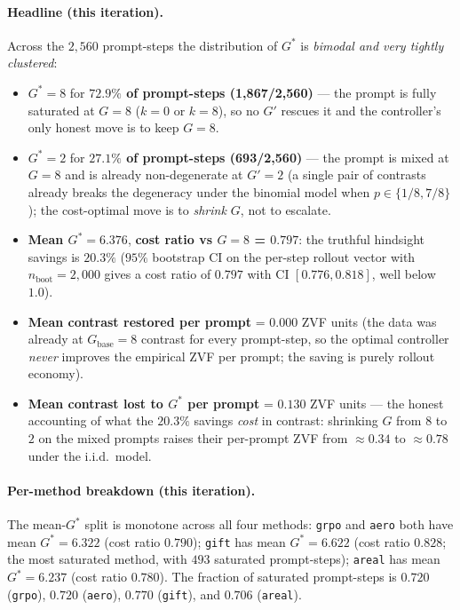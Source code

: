 \paragraph{Headline (this iteration).}
Across the $2{,}560$ prompt-steps the distribution of $G^*$ is
\emph{bimodal and very tightly clustered}:
\begin{itemize}
\item $G^* = 8$ for \textbf{$72.9\%$ of prompt-steps (1{,}867/2{,}560)} ---
the prompt is fully saturated at $G{=}8$ ($k = 0$ or $k = 8$), so no
$G'$ rescues it and the controller's only honest move is to keep $G = 8$.
\item $G^* = 2$ for \textbf{$27.1\%$ of prompt-steps (693/2{,}560)} ---
the prompt is mixed at $G{=}8$ and is already non-degenerate at
$G' = 2$ (a single pair of contrasts already breaks the degeneracy
under the binomial model when $p \in \{1/8, 7/8\}$); the cost-optimal
move is to \emph{shrink $G$}, not to escalate.
\item \textbf{Mean $G^* = 6.376$}, \textbf{cost ratio vs $G{=}8$ =
$0.797$}: the truthful hindsight savings is $20.3\%$
($95\%$ bootstrap CI on the per-step rollout vector with
$n_\text{boot}=2{,}000$ gives a cost ratio of $0.797$ with CI
$[0.776, 0.818]$, well below $1.0$).
\item \textbf{Mean contrast restored per prompt} = $0.000$ ZVF units
(the data was already at $G_\text{base}{=}8$ contrast for every
prompt-step, so the optimal controller \emph{never} improves the
empirical ZVF per prompt; the saving is purely rollout economy).
\item \textbf{Mean contrast lost to $G^*$ per prompt} = $0.130$ ZVF
units --- the honest accounting of what the $20.3\%$ savings
\emph{cost} in contrast: shrinking $G$ from $8$ to $2$ on the mixed
prompts raises their per-prompt ZVF from $\approx 0.34$ to
$\approx 0.78$ under the i.i.d.\ model.
\end{itemize}

\paragraph{Per-method breakdown (this iteration).}
The mean-$G^*$ split is monotone across all four methods:
\texttt{grpo} and \texttt{aero} both have mean $G^*=6.322$
(cost ratio $0.790$); \texttt{gift} has mean $G^* = 6.622$ (cost
ratio $0.828$; the most saturated method, with $493$ saturated
prompt-steps); \texttt{areal} has mean $G^* = 6.237$
(cost ratio $0.780$). The fraction of saturated prompt-steps is
$0.720$ (\texttt{grpo}), $0.720$ (\texttt{aero}), $0.770$
(\texttt{gift}), and $0.706$ (\texttt{areal}).

